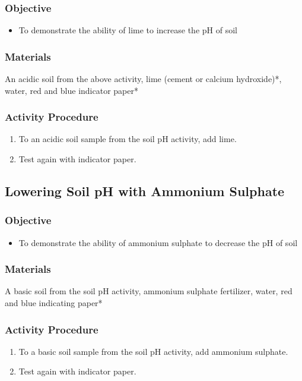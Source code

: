 \subsubsection{Objective}
\begin{itemize}
\item{To demonstrate the ability of lime to increase the pH of soil}
\end{itemize}

\subsubsection{Materials}
An acidic soil from the above activity, lime (cement or calcium hydroxide)*, water, red and blue indicator paper*

\subsubsection{Activity Procedure}
\begin{enumerate}
\item{To an acidic soil sample from the soil pH activity, add lime.}
\item{Test again with indicator paper.}
\end{enumerate}

\subsection{Lowering Soil pH with Ammonium Sulphate}

\subsubsection{Objective}
\begin{itemize}
\item{To demonstrate the ability of ammonium sulphate to decrease the pH of soil}
\end{itemize}

\subsubsection{Materials}
A basic soil from the soil pH activity, ammonium sulphate fertilizer, water, red and blue indicating paper*

\subsubsection{Activity Procedure}
\begin{enumerate}
\item{To a basic soil sample from the soil pH activity, add ammonium sulphate.}
\item{Test again with indicator paper.}
\end{enumerate}

